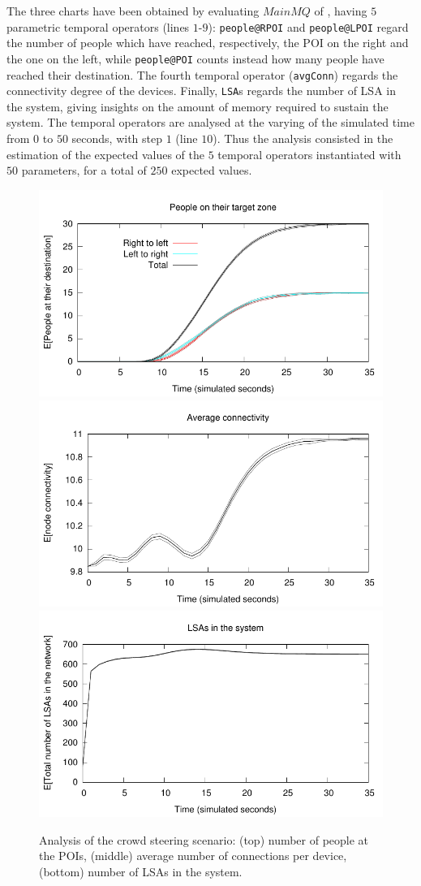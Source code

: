 \documentclass[12pt,a4paper,twoside,openright]{book}
\begin{document}
The three charts have been obtained by evaluating $MainMQ$ of , having $5$ parametric temporal operators (lines $1$-$9$):
%
\texttt{people@RPOI} and \texttt{people@LPOI} regard the number of people which have reached, respectively, the POI on the right and the one on the left, while \texttt{people@POI} counts instead how many people have reached their destination. The fourth temporal operator (\texttt{avgConn}) regards the connectivity degree of the devices. Finally, \texttt{LSA}s regards the number of LSA in the system, giving insights on the amount of memory required to sustain the system.
%
The temporal operators are analysed at the varying of the simulated time from $0$ to $50$ seconds, with step $1$ (line $10$). Thus the analysis consisted in the estimation of the expected values of the $5$ temporal operators instantiated with $50$ parameters, for a total of $250$ expected values. 

\begin{figure}
\begin{center}
\vspace{-0.2cm}
\includegraphics[width=0.7\columnwidth]{img/people}
\includegraphics[width=0.7\columnwidth]{img/connectivity}
\includegraphics[width=0.7\columnwidth]{img/lsas}
\caption{Analysis of the crowd steering scenario: (top) number of people at the POIs, (middle) average number of connections per device, (bottom) number of LSAs in the system.}
\label{img:analysisCharts}
\end{center}
\end{figure}
\end{document}
